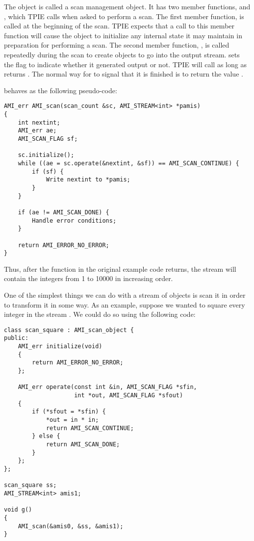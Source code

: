 The object  is called a scan management
object.  It has two
member functions,  and
, which TPIE calls when asked to perform a
scan.  The first member function,  is
called at the beginning of the scan.  TPIE expects that a
call to this member function will cause the object to
initialize any internal state it may maintain in preparation
for performing a scan.  The second member function,
, is called repeatedly during the scan to
create objects to go into the output stream.
 sets the flag  to indicate
whether it generated output or not.  TPIE will call
 as long as  returns
. The normal way for
 to signal that it is finished is to
return the value . 

 behaves as the following pseudo-code:

\begin{verbatim} 
AMI_err AMI_scan(scan_count &sc, AMI_STREAM<int> *pamis)
{
    int nextint;
    AMI_err ae;    
    AMI_SCAN_FLAG sf;

    sc.initialize();    
    while ((ae = sc.operate(&nextint, &sf)) == AMI_SCAN_CONTINUE) {
        if (sf) {
            Write nextint to *pamis;
        }
    }

    if (ae != AMI_SCAN_DONE) {
        Handle error conditions;
    }

    return AMI_ERROR_NO_ERROR;
}
\end{verbatim}

Thus, after the function  in the original
example code returns, the stream  will contain
the integers from 1 to 10000 in increasing order.

One of the simplest things we can do with a stream of
objects is scan it in order to transform it in some way.  As
an example, suppose we wanted to square every integer in the
stream .  We could do so using the following
code:

\begin{verbatim}
class scan_square : AMI_scan_object {
public:
    AMI_err initialize(void)
    {
        return AMI_ERROR_NO_ERROR;
    };

    AMI_err operate(const int &in, AMI_SCAN_FLAG *sfin,
                    int *out, AMI_SCAN_FLAG *sfout)
    {
        if (*sfout = *sfin) {
            *out = in * in;
            return AMI_SCAN_CONTINUE;
        } else {
            return AMI_SCAN_DONE;
        }
    };
};

scan_square ss;
AMI_STREAM<int> amis1;    

void g() 
{
    AMI_scan(&amis0, &ss, &amis1);
}
\end{verbatim}


